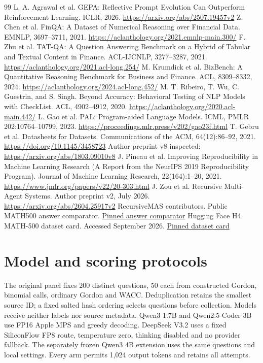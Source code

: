 \begin{thebibliography}{99}
 L. A. Agrawal et al. GEPA: Reflective Prompt Evolution Can Outperform Reinforcement Learning. ICLR, 2026. \url{https://arxiv.org/abs/2507.19457v2}
 Z. Chen et al. FinQA: A Dataset of Numerical Reasoning over Financial Data. EMNLP, 3697--3711, 2021. \url{https://aclanthology.org/2021.emnlp-main.300/}
 F. Zhu et al. TAT-QA: A Question Answering Benchmark on a Hybrid of Tabular and Textual Content in Finance. ACL-IJCNLP, 3277--3287, 2021. \url{https://aclanthology.org/2021.acl-long.254/}
 M. Krumdick et al. BizBench: A Quantitative Reasoning Benchmark for Business and Finance. ACL, 8309--8332, 2024. \url{https://aclanthology.org/2024.acl-long.452/}
 M. T. Ribeiro, T. Wu, C. Guestrin, and S. Singh. Beyond Accuracy: Behavioral Testing of NLP Models with CheckList. ACL, 4902--4912, 2020. \url{https://aclanthology.org/2020.acl-main.442/}
 L. Gao et al. PAL: Program-aided Language Models. ICML, PMLR 202:10764--10799, 2023. \url{https://proceedings.mlr.press/v202/gao23f.html}
 T. Gebru et al. Datasheets for Datasets. Communications of the ACM, 64(12):86--92, 2021. \url{https://doi.org/10.1145/3458723} Author preprint v8 inspected: \url{https://arxiv.org/abs/1803.09010v8}
 J. Pineau et al. Improving Reproducibility in Machine Learning Research (A Report from the NeurIPS 2019 Reproducibility Program). Journal of Machine Learning Research, 22(164):1--20, 2021. \url{https://www.jmlr.org/papers/v22/20-303.html}
 J. Zou et al. Recursive Multi-Agent Systems. Author preprint v2, July 2026. \url{https://arxiv.org/abs/2604.25917v2}
 RecursiveMAS contributors. Public MATH500 answer comparator. \href{https://github.com/RecursiveMAS/RecursiveMAS/blob/cbfcaab56c9a8f660a9be598750b4ff3cd762056/inference/inference_utils/answer_utils.py}{Pinned answer comparator}
 Hugging Face H4. MATH-500 dataset card. Accessed September 2026. \href{https://huggingface.co/datasets/HuggingFaceH4/MATH-500/blob/6e4ed1a2a79af7d8630a6b768ec859cb5af4d3be/README.md}{Pinned dataset card}
\end{thebibliography}

\clearpage
\appendix
\section{Model and scoring protocols}\label{app:synthetic-model-protocol}
The original panel fixes 200 distinct questions, 50 each from constructed Gordon, binomial calls, ordinary Gordon and WACC. Deduplication retains the smallest source ID; a fixed salted hash ordering selects questions before collection. Models receive neither labels nor source metadata. Qwen3 1.7B and Qwen2.5-Coder 3B use FP16 Apple MPS and greedy decoding. DeepSeek V3.2 uses a fixed SiliconFlow FP8 route, temperature zero, thinking disabled and no provider fallback. The separately frozen Qwen3 4B extension uses the same questions and local settings. Every arm permits 1,024 output tokens and retains all attempts.

